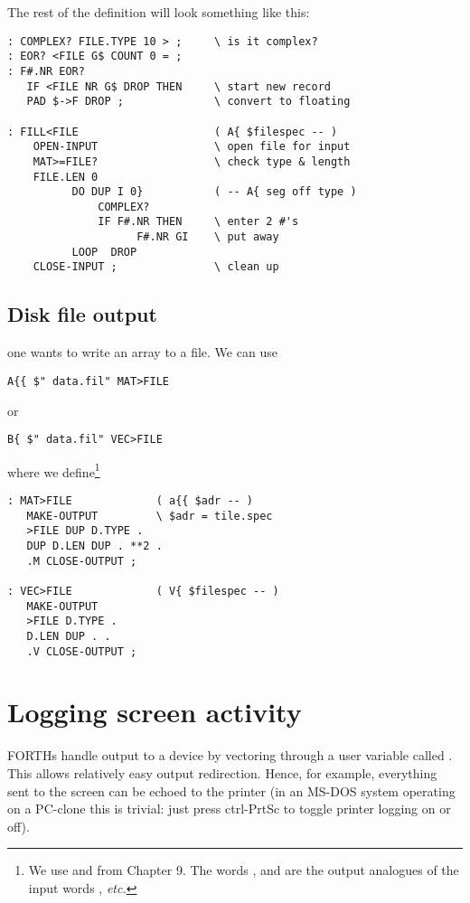 The rest of the definition will look something like this:


\begin{lstlisting}
: COMPLEX? FILE.TYPE 10 > ;     \ is it complex?
: EOR? <FILE G$ COUNT 0 = ;
: F#.NR EOR?
   IF <FILE NR G$ DROP THEN     \ start new record
   PAD $->F DROP ;              \ convert to floating

: FILL<FILE                     ( A{ $filespec -- )
    OPEN-INPUT                  \ open file for input
    MAT>=FILE?                  \ check type & length
    FILE.LEN 0
          DO DUP I 0}           ( -- A{ seg off type )
              COMPLEX?
              IF F#.NR THEN     \ enter 2 #'s
                    F#.NR GI    \ put away
          LOOP  DROP
    CLOSE-INPUT ;               \ clean up
\end{lstlisting}

\subsection{Disk file output}

 one wants to write an array to a file.
We can use

\begin{lstlisting}
A{{ $" data.fil" MAT>FILE
\end{lstlisting}
or
\begin{lstlisting}
B{ $" data.fil" VEC>FILE
\end{lstlisting}

where we define\footnote{We use  and  from Chapter 9. The words ,  and  are the output analogues of the input words , \textit{etc.}}

\begin{lstlisting}
: MAT>FILE             ( a{{ $adr -- )
   MAKE-OUTPUT         \ $adr = tile.spec
   >FILE DUP D.TYPE .
   DUP D.LEN DUP . **2 .
   .M CLOSE-OUTPUT ;

: VEC>FILE             ( V{ $filespec -- )
   MAKE-OUTPUT
   >FILE D.TYPE .
   D.LEN DUP . .
   .V CLOSE-OUTPUT ;
\end{lstlisting}

\section{Logging screen activity}
 FORTHs handle output to a device by vectoring through a user variable called .
This allows relatively easy output redirection.
Hence, for example, everything sent to the screen can be echoed to the printer (in an MS-DOS system operating on a PC-clone this is trivial: just press ctrl-PrtSc to toggle printer logging on or off).


